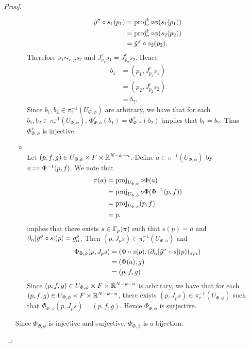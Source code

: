 \documentclass{book}
\begin{document}
\begin{proof}
\begin{enumerate}
\begin{itemize}
\begin{align*}
				\tilde{y}^{\sigma} \circ s_1(p_1)
				& = \operatorname{\text{proj}}^k_{\sigma} \circ \phi(s_1(p_1)) \\
				& = \operatorname{\text{proj}}^k_{\sigma} \circ \phi(s_2(p_2)) \\
				& = \tilde{y}^{\sigma} \circ s_2(p_2).
			\end{align*}
			Therefore $s_1 \sim_{r, p} s_2$ and $J^r_{p_1} s_1 = J^r_{p_2} s_2$. Hence 
			\begin{align*}
				b_1
				& = (p_1, J^r_{p_1} s_1) \\
				& = (p_2, J^r_{p_2} s_2) \\
				& = b_2.
			\end{align*}
			Since $b_1, b_2 \in \pi_r^{-1}(U_{\Phi, \phi})$ are arbitrary, we have that for each $b_1, b_2 \in \pi_r^{-1}(U_{\Phi, \phi})$, $\Phi^r_{\Phi, \phi}(b_1) = \Phi^r_{\Phi, \phi}(b_2)$ implies that $b_1 = b_2$. Thus $\Phi^r_{\Phi, \phi}$ is injective. 
			\item {} \\
			Let $(p, f, g) \in U_{\Phi, \phi} \times F \times \mathbb{R}^{N - k - n}$. Define $a \in \pi^{-1}(U_{\Phi, \phi})$ by $a \vcentcolon= \Phi^{-1}(p, f)$. We note that 
			\begin{align*}
				\pi(a)
				& = \operatorname{\text{proj}}_{U_{\Phi, \phi}} \circ \Phi (a) \\
				& = \operatorname{\text{proj}}_{U_{\Phi, \phi}} \circ \Phi (\Phi^{-1}(p, f)) \\
				& = \operatorname{\text{proj}}_{U_{\Phi, \phi}}(p, f) \\
				& = p.
			\end{align*}
			  implies that there exists $s \in \Gamma_p(\pi)$ such that $s(p) = a$ and $\partial_{\alpha}[\tilde{y}^{\sigma} \circ s](p) = g^{\sigma}_{\alpha}$. Then $(p, J_p s) \in \pi_r^{-1}(U_{\Phi, \phi})$ and
			 \begin{align*}
			 	\Phi_{\Phi, \phi}(p, J_p s)
			 	& = (\Phi \circ s(p), (\partial_{\alpha}[\tilde{y}^{\sigma} \circ s](p))_{\sigma, \alpha}) \\
			 	& = (\Phi(a), g) \\
			 	& = (p,f,g)
			 \end{align*}
		 	Since $(p, f, g) \in U_{\Phi, \phi} \times F \times \mathbb{R}^{N - k - n}$ is arbitrary, we have that for each $(p, f, g) \in U_{\Phi, \phi} \times F \times \mathbb{R}^{N - k - n}$, there exists $(p, J_p s) \in \pi_r^{-1}(U_{\Phi, \phi})$ such that $\Phi_{\Phi, \phi}(p, J_p s) = (p, f, g)$. Hence $\Phi_{\Phi, \phi}$ is surjective.
		\end{itemize}
		Since $\Phi_{\Phi, \phi}$ is injective and surjective, $\Phi_{\Phi, \phi}$ is a bijection.

\end{enumerate}
\end{proof}
\end{document}
